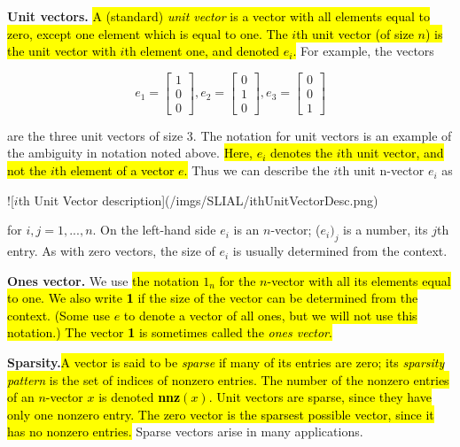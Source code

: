 \documentclass[11pt,oneside,a4paper,openright]{article}
\begin{document}
\textbf{Unit vectors.} \hl{A (standard) \emph{unit vector} is a vector with all elements equal to zero, except one element which is equal to one. The $i$th unit vector (of size $n$) is the unit vector with $i$th element one, and denoted $e_i$.} For example, the vectors

\begin{equation}
    e_1 =
    \begin{bmatrix}
        1 \\
        0 \\
        0 
    \end{bmatrix},
    e_2 =
    \begin{bmatrix}
        0 \\
        1 \\
        0 
    \end{bmatrix},
    e_3 =
    \begin{bmatrix}
        0 \\
        0 \\
        1 
    \end{bmatrix}    
\end{equation}

are the three unit vectors of size 3. The notation for unit vectors is an example of the ambiguity in notation noted above. \hl{Here, $e_i$ denotes the $i$th unit vector, and not the $i$th element of a vector $e$.} Thus we can describe the $i$th unit n-vector $e_i$ as

![$i$th Unit Vector description](/imgs/SLIAL/ithUnitVectorDesc.png)

for $i,j = 1, . . . , n$. On the left-hand side $e_i$ is an $n$-vector; ($e_i)_j$ is a number, its $j$th entry. As with zero vectors, the size of $e_i$ is usually determined from the context.

\textbf{Ones vector.} We use \hl{the notation $1_n$ for the $n$-vector with all its elements equal to one. We also write \textbf{1} if the size of the vector can be determined from the context. (Some use $e$ to denote a vector of all ones, but we will not use this notation.) The vector \textbf{1} is sometimes called the \emph{ones vector}.}

\textbf{Sparsity.}\hl{A vector is said to be \emph{sparse} if many of its entries are zero; its \emph{sparsity pattern} is the set of indices of nonzero entries. The number of the nonzero entries of an $n$-vector $x$ is denoted \textbf{nnz}$(x)$. Unit vectors are sparse, since they have only one nonzero entry. The zero vector is the sparsest possible vector, since it has no nonzero entries.} Sparse vectors arise in many applications.
\end{document}
